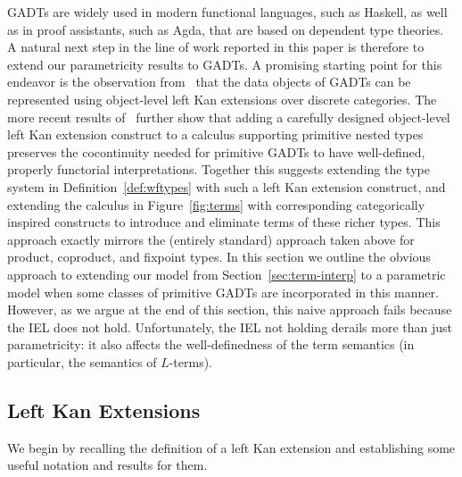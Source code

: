 \documentclass{lmcs}
\theoremstyle{plain}\newtheorem{satz}[thm]{Satz}
\begin{document}
GADTs are widely used in modern functional languages, such as Haskell,
as well as in proof assistants, such as Agda, that are based on
dependent type theories. A natural next step in the line of work
reported in this paper is therefore to extend our parametricity
results to GADTs. A promising starting point for this endeavor is the
observation from~\cite{jg08} that the data objects of GADTs can be
represented using object-level left Kan extensions over discrete
categories. The more recent results of~\cite{jp19} further show that
adding a carefully designed object-level left Kan extension construct
to a calculus supporting primitive nested types preserves the
cocontinuity needed for primitive GADTs to have well-defined, properly
functorial interpretations. Together this suggests extending the type
system in Definition~\ref{def:wftypes} with such a left Kan extension
construct, and extending the calculus in Figure~\ref{fig:terms} with
corresponding categorically inspired constructs to introduce and
eliminate terms of these richer types. This approach exactly mirrors
the (entirely standard) approach taken above for product, coproduct,
and fixpoint types. In this section we outline the obvious approach to
extending our model from Section~\ref{sec:term-interp} to a parametric
model when some classes of primitive GADTs are incorporated in this
manner. However, as we argue at the end of this section, this naive
approach fails because the IEL does not hold. Unfortunately, the IEL
not holding derails more than just parametricity: it also affects the
well-definedness of the term semantics (in particular, the semantics
of $L$-terms).

\subsection{Left Kan Extensions}\label{sec:lke}

We begin by recalling the definition of a left Kan extension and
establishing some useful notation and results for them.
\end{document}
